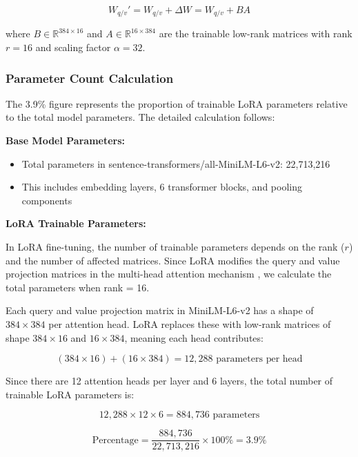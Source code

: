 \begin{equation}
W_{q/v}' = W_{q/v} + \Delta W = W_{q/v} + B A
\end{equation}

where $B \in \mathbb{R}^{384 \times 16}$ and $A \in \mathbb{R}^{16 \times 384}$ are the trainable low-rank matrices with rank $r=16$ and scaling factor $\alpha=32$.

\subsubsection{Parameter Count Calculation}

The 3.9\% figure represents the proportion of trainable LoRA parameters relative to the total model parameters. The detailed calculation follows:

\textbf{Base Model Parameters:}
\begin{itemize}
\item Total parameters in sentence-transformers/all-MiniLM-L6-v2: 22,713,216
\item This includes embedding layers, 6 transformer blocks, and pooling components
\end{itemize}

\textbf{LoRA Trainable Parameters:}

In LoRA fine-tuning, the number of trainable parameters depends on the rank ($r$) and the number of affected matrices. Since LoRA modifies the query and value projection matrices in the multi-head attention mechanism \cite{vaswani2017attention}, we calculate the total parameters when rank = 16.

Each query and value projection matrix in MiniLM-L6-v2 has a shape of $384 \times 384$ per attention head. LoRA replaces these with low-rank matrices of shape $384 \times 16$ and $16 \times 384$, meaning each head contributes:

\begin{equation}
(384 \times 16) + (16 \times 384) = 12,288 \text{ parameters per head}
\end{equation}

Since there are 12 attention heads per layer and 6 layers, the total number of trainable LoRA parameters is:

\begin{equation}
12,288 \times 12 \times 6 = 884,736 \text{ parameters}
\end{equation}

\begin{equation}
\text{Percentage} = \frac{884,736}{22,713,216} \times 100\% = 3.9\%
\end{equation}

